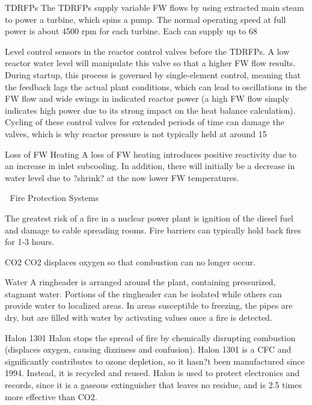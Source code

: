 \documentclass[10pt]{article}
\begin{document}
TDRFPs
The TDRFPs supply variable FW flows by using extracted main steam to power a turbine, which spins a pump. The normal operating speed at full power is about 4500 rpm for each turbine. Each can supply up to 68%

Level control sensors in the reactor control valves before the TDRFPs. A low reactor water level will manipulate this valve so that a higher FW flow results. During startup, this process is governed by single-element control, meaning that the feedback lags the actual plant conditions, which can lead to oscillations in the FW flow and wide swings in indicated reactor power (a high FW flow simply indicates high power due to its strong impact on the heat balance calculation). Cycling of these control valves for extended periods of time can damage the valves, which is why reactor pressure is not typically held at around 15%

Loss of FW Heating
A loss of FW heating introduces positive reactivity due to an increase in inlet subcooling. In addition, there will initially be a decrease in water level due to ?shrink? at the now lower FW temperatures. 


Fire Protection Systems

The greatest risk of a fire in a nuclear power plant is ignition of the diesel fuel and damage to cable spreading rooms. Fire barriers can typically hold back fires for 1-3 hours. 

CO2
CO2 displaces oxygen so that combustion can no longer occur. 

Water
A ringheader is arranged around the plant, containing pressurized, stagnant water. Portions of the ringheader can be isolated while others can provide water to localized areas. In areas susceptible to freezing, the pipes are dry, but are filled with water by activating values once a fire is detected. 

Halon 1301
Halon stops the spread of fire by chemically disrupting combustion (displaces oxygen, causing dizziness and confusion). Halon 1301 is a CFC and significantly contributes to ozone depletion, so it hasn?t been manufactured since 1994. Instead, it is recycled and reused. Halon is used to protect electronics and records, since it is a gaseous extinguisher that leaves no residue, and is 2.5 times more effective than CO2. 
\end{document}
